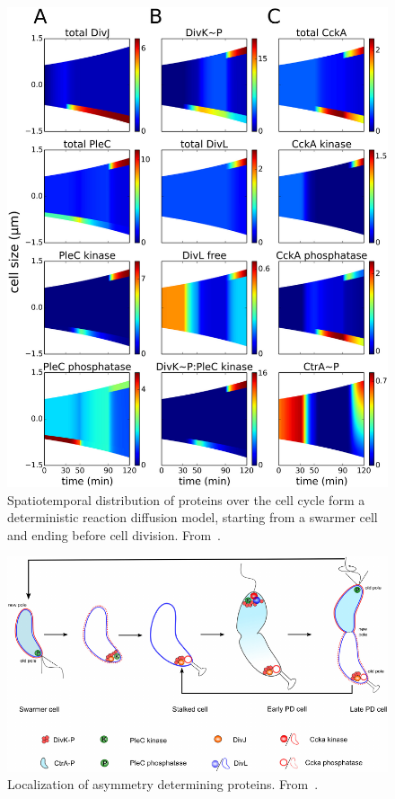 \begin{figure}
    \centering
    \includegraphics{spatiotemporal-distribution}
    \caption{
        Spatiotemporal distribution of proteins over the cell cycle form a deterministic reaction diffusion model, starting from a swarmer cell and ending before cell division.
        From~\cite{subramanian2015}.
        \label{fig:spatiotemporal-distribution}
     }
\end{figure}

\begin{figure}
    \centering
    \includegraphics{polar-localization}
    \caption{
        Localization of asymmetry determining proteins.
        From~\cite{subramanian2015}.
        \label{fig:polar-localization}
     }
\end{figure}

